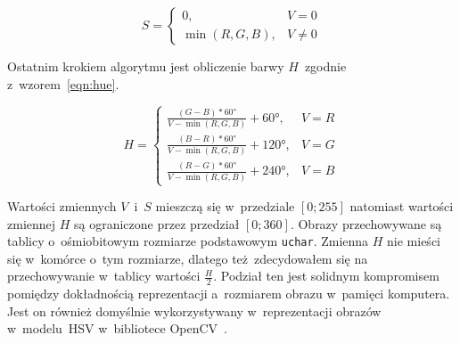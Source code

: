 \begin{equation}
    \label{eqn:saturation}
    S = \left\{ 
        \begin{array}{ll}
            0, & V = 0 \\
            \min{(R, G, B)}, & V \ne 0
        \end{array} 
        \right.
\end{equation}

Ostatnim krokiem algorytmu jest obliczenie barwy $H$~zgodnie z~wzorem~\ref{eqn:hue}.

\begin{equation}
    \label{eqn:hue}
    H = \left\{ 
        \begin{array}{ll}
            \frac{(G - B) * 60\si{\degree}}{V - \min{(R, G, B)}} + 60\si{\degree}, & V = R \\
            \frac{(B - R) * 60\si{\degree}}{V - \min{(R, G, B)}} + 120\si{\degree}, & V = G \\
            \frac{(R - G) * 60\si{\degree}}{V - \min{(R, G, B)}} + 240\si{\degree}, & V = B
        \end{array} 
        \right.
\end{equation}
\smallskip

Wartości zmiennych $V$~i~$S$ mieszczą się w~przedziale $[0; 255]$ natomiast wartości zmiennej $H$ są ograniczone przez przedział $[0; 360]$. Obrazy przechowywane są tablicy o~ośmiobitowym rozmiarze podstawowym \texttt{uchar}. Zmienna $H$ nie mieści się w~komórce o~tym rozmiarze, dlatego też zdecydowałem się na przechowywanie w~tablicy wartości $\frac{H}{2}$. Podział ten jest solidnym kompromisem pomiędzy dokładnością reprezentacji a~rozmiarem obrazu w~pamięci komputera. Jest on również domyślnie wykorzystywany w~reprezentacji obrazów w~modelu~HSV w~bibliotece OpenCV~\cite{opencv}.